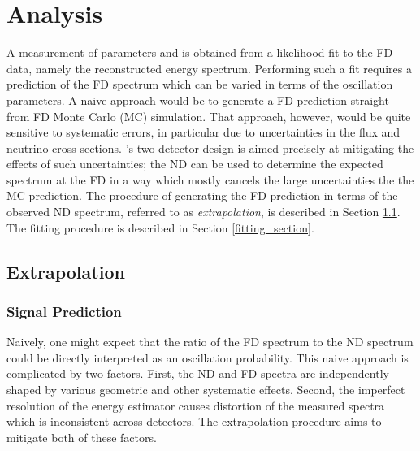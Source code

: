 \chapter{Analysis}
\label{analysis_chapter}

A measurement of parameters \deltamtht and \thetatth is obtained from
a likelihood fit to the FD data, namely the reconstructed energy spectrum.
Performing such a fit requires a prediction of the FD spectrum which can be
varied in terms of the oscillation parameters.
A naive approach would be to generate a FD prediction straight from
FD Monte Carlo (MC) simulation.
That approach, however, would be quite sensitive to systematic errors,
in particular due to uncertainties  in the \numi flux and neutrino
cross sections.
\nova's two-detector design is aimed precisely at mitigating the effects of
such uncertainties; the ND can be used to determine the expected
spectrum at the FD in a way which mostly cancels the large uncertainties the
the MC prediction.
The procedure of generating the FD prediction in terms of the observed
ND spectrum, referred to as \textit{extrapolation}, is described in Section
\ref{extrap_section}.
The fitting procedure is described in Section \ref{fitting_section}.


\section{Extrapolation}
\label{extrap_section}

\subsection{\numu Signal Prediction}

Naively, one might expect that the ratio of the FD spectrum to the ND spectrum
could be directly interpreted as an oscillation probability.
This naive approach is complicated by two factors.
First, the ND and FD spectra are independently shaped by various geometric
and other systematic effects.
Second, the imperfect resolution of the energy estimator causes
distortion of the measured spectra which is inconsistent across detectors.
The extrapolation procedure aims to mitigate both of these factors.

